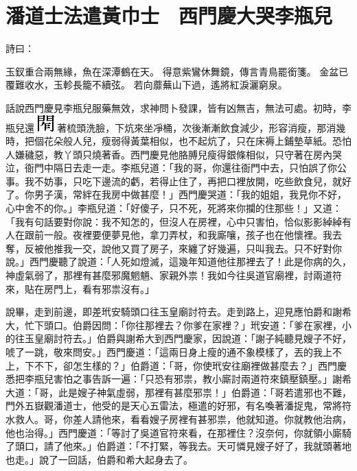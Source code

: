 %

\chapter{潘道士法遣黃巾士　西門慶大哭李瓶兒}

詩曰：

玉釵重合兩無緣，魚在深潭鶴在天。
得意紫鸞休舞鏡，傳言青鳥罷銜箋。
金盆已覆難收水，玉軫長籠不續弦。
若向蘼蕪山下過，遙將紅淚灑窮泉。

話說西門慶見李瓶兒服藥無效，求神問卜發課，皆有凶無吉，無法可處。初時，李瓶兒還
\includegraphics{figures-char/image00571.jpeg}%
著梳頭洗臉，下炕來坐凈桶，次後漸漸飲食減少，形容消瘦，那消幾時，把個花朵般人兒，瘦弱得黃葉相似，也不起炕了，只在床褥上鋪墊草紙。恐怕人嫌穢惡，教丫頭只燒著香。西門慶見他胳膊兒瘦得銀條相似，只守著在房內哭泣，衙門中隔日去走一走。李瓶兒道：「我的哥，你還往衙門中去，只怕誤了你公事。我不妨事，只吃下邊流的虧，若得止住了，再把口裡放開，吃些飲食兒，就好了。你男子漢，常絆在我房中做甚麼！」西門慶哭道：「我的姐姐，我見你不好，心中舍不的你。」李瓶兒道：「好傻子，只不死，死將來你攔的住那些！」又道：「我有句話要對你說：我不知怎的，但沒人在房裡，心中只害怕，恰似影影綽綽有人在跟前一般。夜裡要便夢見他，拿刀弄杖，和我廝嚷，孩子也在他懷裡。我去奪，反被他推我一交，說他又買了房子，來纏了好幾遍，只叫我去。只不好對你說。」西門慶聽了說道：「人死如燈滅，這幾年知道他往那裡去了！此是你病的久，神虛氣弱了，那裡有甚麼邪魔魍魎、家親外祟！我如今往吳道官廟裡，討兩道符來，貼在房門上，看有邪祟沒有。」

說畢，走到前邊，即差玳安騎頭口往玉皇廟討符去。走到路上，迎見應怕爵和謝希大，忙下頭口。伯爵因問：「你往那裡去？你爹在家裡？」玳安道：「爹在家裡，小的往玉皇廟討符去。」伯爵與謝希大到西門慶家，因說道：「謝子純聽見嫂子不好，唬了一跳，敬來問安。」西門慶道：「這兩日身上瘦的通不象模樣了，丟的我上不上，下不下，卻怎生樣的？」伯爵道：「哥，你使玳安往廟裡做甚麼去？」西門慶悉把李瓶兒害怕之事告訴一遍：「只恐有邪祟，教小廝討兩道符來鎮壓鎮壓。」謝希大道：「哥，此是嫂子神氣虛弱，那裡有甚麼邪祟！」伯爵道：「哥若遣邪也不難，門外五嶽觀潘道士，他受的是天心五雷法，極遣的好邪，有名喚著潘捉鬼，常將符水救人。哥，你差人請他來，看看嫂子房裡有甚邪祟，他就知道。你就教他治病，他也治得。」西門慶道：「等討了吳道官符來看，在那裡住？沒奈何，你就領小廝騎了頭口，請了他來。」伯爵道：「不打緊，等我去。天可憐見嫂子好了，我就頭著地也走。」說了一回話，伯爵和希大起身去了。

